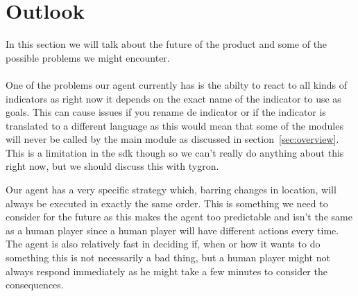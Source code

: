 \section{Outlook}
In this section we will talk about the future of the product and some of the possible problems we might encounter.
\\
\\
One of the problems our agent currently has is the abilty to react to all kinds of indicators as right now it depends on the exact name of the indicator to use as goals. 
This can cause issues if you rename de indicator or if the indicator is translated to a different language as this would mean that some of the modules will never be called by the main module as discussed in section~\ref{sec:overview}. 
This is a limitation in the sdk though so we can't really do anything about this right now, but we should discuss this with tygron.

Our agent has a very specific strategy which, barring changes in location, will always be executed in exactly the same order.
This is something we need to consider for the future as this makes the agent too predictable and isn't the same as a human player since a human player will have different actions every time.
The agent is also relatively fast in deciding if, when or how it wants to do something this is not necessarily a bad thing, but a human player might not always respond immediately as he might take a few minutes to consider the consequences. 

